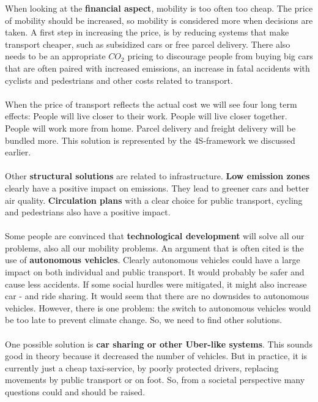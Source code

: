 \documentclass[../summary.tex]{subfiles}
\begin{document}
	When looking at the \textbf{financial aspect}, mobility is too often too cheap. The price of mobility should be increased, so mobility is considered more when decisions are taken. A first step in increasing the price, is by reducing systems that make transport cheaper, such as subsidized cars or free parcel delivery. There also needs to be an appropriate $CO_{2}$ pricing to discourage people from buying big cars that are often paired with increased emissions, an increase in fatal accidents with cyclists and pedestrians and other costs related to transport. 
	\\\\
	When the price of transport reflects the actual cost we will see four long term effects: People will live closer to their work. People will live closer together. People will work more from home. Parcel delivery and freight delivery will be bundled more. This solution is represented by the 4S-framework we discussed earlier. 
	\\\\
	Other \textbf{structural solutions} are related to infrastructure. \textbf{Low emission zones} clearly have a positive impact on emissions. They lead to greener cars and better air quality. \textbf{Circulation plans} with a clear choice for public transport, cycling and pedestrians also have a positive impact. 
	\\\\
	 Some people are convinced that \textbf{technological development} will solve all our problems, also all our mobility problems. An argument that is often  cited is the use of  \textbf{autonomous vehicles}. Clearly autonomous vehicles could have a large impact on both individual and public transport. It would probably be safer and cause less accidents. If some social hurdles were mitigated, it might also increase car - and ride sharing. It would seem that there are no downsides to autonomous vehicles. However, there is one problem: the switch to autonomous vehicles would be too late to prevent climate change. So, we need to find other solutions.
	 \\\\
	 One possible solution is \textbf{car sharing or other Uber-like systems}. This sounds good in theory because it decreased the number of vehicles. But in practice, it is currently just a cheap taxi-service, by poorly protected drivers, replacing movements by public transport or on foot. So, from a societal perspective many questions could and should be raised.
	 \\\\
\end{document}

